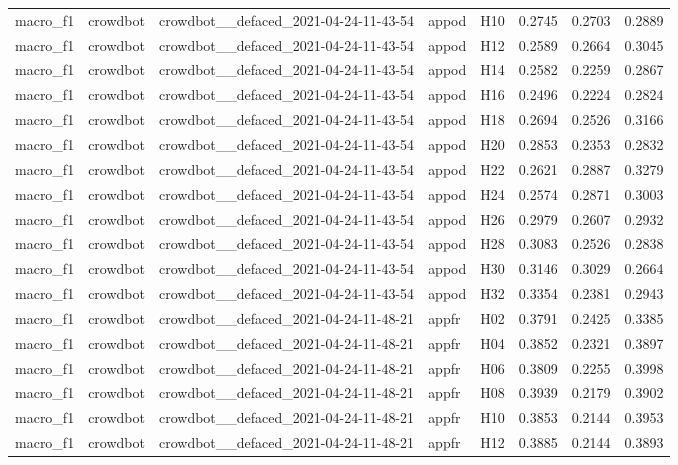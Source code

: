 \begin{table}[tbp]
\begin{tabular}{lllllrrr}
macro\_f1 & crowdbot & crowdbot\_\_defaced\_2021-04-24-11-43-54 & appod & H10 & 0.2745 & 0.2703 & 0.2889 \\
macro\_f1 & crowdbot & crowdbot\_\_defaced\_2021-04-24-11-43-54 & appod & H12 & 0.2589 & 0.2664 & 0.3045 \\
macro\_f1 & crowdbot & crowdbot\_\_defaced\_2021-04-24-11-43-54 & appod & H14 & 0.2582 & 0.2259 & 0.2867 \\
macro\_f1 & crowdbot & crowdbot\_\_defaced\_2021-04-24-11-43-54 & appod & H16 & 0.2496 & 0.2224 & 0.2824 \\
macro\_f1 & crowdbot & crowdbot\_\_defaced\_2021-04-24-11-43-54 & appod & H18 & 0.2694 & 0.2526 & 0.3166 \\
macro\_f1 & crowdbot & crowdbot\_\_defaced\_2021-04-24-11-43-54 & appod & H20 & 0.2853 & 0.2353 & 0.2832 \\
macro\_f1 & crowdbot & crowdbot\_\_defaced\_2021-04-24-11-43-54 & appod & H22 & 0.2621 & 0.2887 & 0.3279 \\
macro\_f1 & crowdbot & crowdbot\_\_defaced\_2021-04-24-11-43-54 & appod & H24 & 0.2574 & 0.2871 & 0.3003 \\
macro\_f1 & crowdbot & crowdbot\_\_defaced\_2021-04-24-11-43-54 & appod & H26 & 0.2979 & 0.2607 & 0.2932 \\
macro\_f1 & crowdbot & crowdbot\_\_defaced\_2021-04-24-11-43-54 & appod & H28 & 0.3083 & 0.2526 & 0.2838 \\
macro\_f1 & crowdbot & crowdbot\_\_defaced\_2021-04-24-11-43-54 & appod & H30 & 0.3146 & 0.3029 & 0.2664 \\
macro\_f1 & crowdbot & crowdbot\_\_defaced\_2021-04-24-11-43-54 & appod & H32 & 0.3354 & 0.2381 & 0.2943 \\
macro\_f1 & crowdbot & crowdbot\_\_defaced\_2021-04-24-11-48-21 & appfr & H02 & 0.3791 & 0.2425 & 0.3385 \\
macro\_f1 & crowdbot & crowdbot\_\_defaced\_2021-04-24-11-48-21 & appfr & H04 & 0.3852 & 0.2321 & 0.3897 \\
macro\_f1 & crowdbot & crowdbot\_\_defaced\_2021-04-24-11-48-21 & appfr & H06 & 0.3809 & 0.2255 & 0.3998 \\
macro\_f1 & crowdbot & crowdbot\_\_defaced\_2021-04-24-11-48-21 & appfr & H08 & 0.3939 & 0.2179 & 0.3902 \\
macro\_f1 & crowdbot & crowdbot\_\_defaced\_2021-04-24-11-48-21 & appfr & H10 & 0.3853 & 0.2144 & 0.3953 \\
macro\_f1 & crowdbot & crowdbot\_\_defaced\_2021-04-24-11-48-21 & appfr & H12 & 0.3885 & 0.2144 & 0.3893 \\

\end{tabular}
\end{table}

